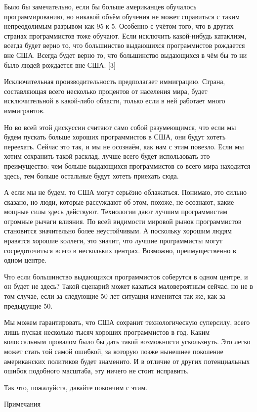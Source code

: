 \documentclass[ebook,12pt,oneside,openany]{memoir}
\begin{document}
Было бы замечательно, если бы больше американцев обучалось
программированию, но никакой объём обучения не может справиться с
таким непреодолимым разрывом как 95 к 5. Особенно с учётом того, что в
других странах программистов тоже обучают. Если исключить какой-нибудь
катаклизм, всегда будет верно то, что большинство выдающихся
программистов рождается вне США. Всегда будет верно то, что
большинство выдающихся в чём бы то ни было людей рождается вне США.
[3]

Исключительная производительность предполагает иммиграцию. Страна,
составляющая всего несколько процентов от населения мира, будет
исключительной в какой-либо области, только если в ней работает много
иммигрантов.

Но во всей этой дискуссии считают само собой разумеющимся, что если мы
будем пускать больше хороших программистов в США, они будут хотеть
переехать. Сейчас это так, и мы не осознаём, как нам с этим повезло.
Если мы хотим сохранить такой расклад, лучше всего будет использовать
это преимущество: чем больше выдающихся программистов со всего мира
находится здесь, тем больше остальные будут хотеть приехать сюда.

А если мы не будем, то США могут серьёзно облажаться. Понимаю, это
сильно сказано, но люди, которые рассуждают об этом, похоже, не
осознают, какие мощные силы здесь действуют. Технологии дают лучшим
программистам огромные рычаги влияния. По всей видимости мировой рынок
программистов становится значительно более неустойчивым. А поскольку
хорошим людям нравятся хорошие коллеги, это значит, что лучшие
программисты могут сосредоточиться всего в нескольких центрах.
Возможно, преимущественно в одном центре.

Что если большинство выдающихся программистов соберутся в одном
центре, и он будет не здесь? Такой сценарий может казаться
маловероятным сейчас, но не в том случае, если за следующие 50 лет
ситуация изменится так же, как за предыдущие 50.

Мы можем гарантировать, что США сохранит технологическую суперсилу,
всего лишь пуская несколько тысяч хороших программистов в год. Каким
колоссальным провалом было бы дать такой возможности ускользнуть. Это
легко может стать той самой ошибкой, за которую позже нынешнее
поколение американских политиков будет знаменито. И в отличие от
других потенциальных ошибок подобного масштаба, эту ничего не стоит
исправить.

Так что, пожалуйста, давайте покончим с этим.

Примечания
\end{document}
